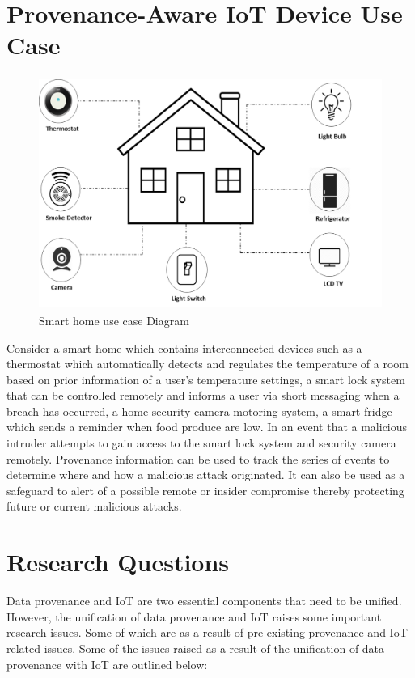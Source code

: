 \section{Provenance-Aware IoT Device Use Case}

\begin{figure}[h]
\begin{center}
\includegraphics[height=3in]{smart_h.png}
\end{center}
\caption{Smart home use case Diagram}
\end{figure}


Consider a smart home which contains interconnected devices such as a thermostat which automatically detects and regulates the temperature of a room based on prior information of a user's temperature settings, a smart lock system that can be controlled remotely and informs a user via short messaging when a breach has occurred, a home security camera motoring system, a smart fridge which sends a reminder when food produce are low. In an event that a malicious intruder attempts  to gain access to the smart lock system and security camera remotely. Provenance information can be used to track the series  of events to determine where and how a malicious attack originated. It can also be used as a safeguard to alert of a possible remote or insider compromise thereby protecting future or current malicious attacks. 





\section{Research Questions}
Data provenance and IoT are two essential components that need to be unified. However, the unification of data provenance and IoT raises some important research issues. Some of which are as a result of pre-existing provenance and IoT related issues. Some of the issues raised as a result of the unification of data provenance with IoT are outlined below:

